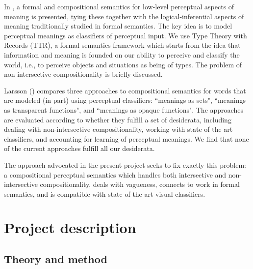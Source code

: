 \documentclass[11pt,a4paper]{article}
\newcommand{\instruction}[1]{}
\begin{document}
In \cite{Larsson2015formal}, a formal and compositional semantics for low-level perceptual aspects of meaning is presented, tying these together with the logical-inferential aspects of meaning traditionally studied in  formal semantics. The key idea is to model perceptual meanings as classifiers of perceptual input. We use Type Theory with Records (TTR), a formal semantics framework which starts from the idea that information and meaning is founded on our ability to perceive and classify the world, i.e., to perceive objects and situations as being of types. The problem of non-intersective compositionality is briefly discussed.  


Larsson (\citeyear{larsson2017compositionality}\/) compares three approaches to compositional semantics for words that are modeled (in part) using perceptual classifiers: ``meanings as sets", ``meanings as transparent functions", and ``meanings as opaque functions".  The approaches are evaluated according to whether they fulfill a set of desiderata, including dealing with non-intersective compositionality, working with state of the art classifiers, and accounting for learning of perceptual meanings.  We find that none of the current approaches fulfill all our desiderata.

The approach advocated in the present project seeks to fix exactly this problem: a compositional perceptual semantics which handles both intersective and non-intersective compositionality, deals with vagueness, connects to work in formal semantics, and is compatible with state-of-the-art visual classifiers.



\section{Project description}
\instruction{Describe the project design, including the following items}

\subsection{Theory and method}
\instruction{Describe the underlying theory and the methods to be applied in order to reach the project goal.}

\end{document}
